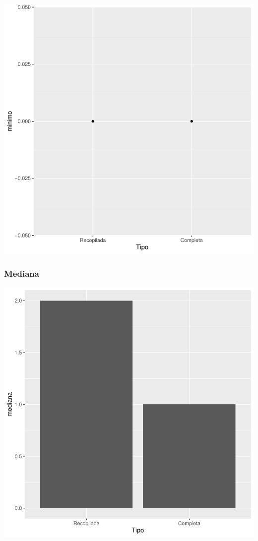 \documentclass{article}
\begin{document}
\includegraphics{seguimento2-032}

\subsubsection{Mediana}

\includegraphics{seguimento2-033}
\end{document}
